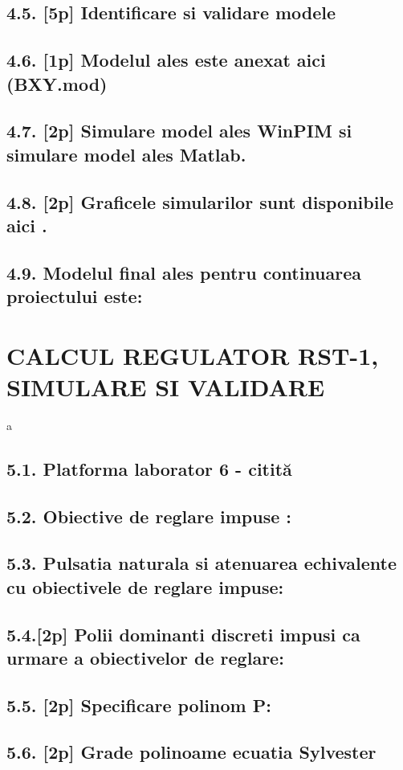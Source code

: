 \documentclass[12pt,english]{article}
\begin{document}
\subsection {4.5. [5p]  Identificare si validare modele }
\subsection {4.6. [1p] Modelul ales este anexat aici (BXY.mod) }
\subsection {4.7. [2p] Simulare model ales WinPIM si simulare model ales Matlab. }
\subsection {4.8. [2p]  Graficele simularilor sunt disponibile aici .  }
\subsection {4.9. Modelul final ales pentru continuarea proiectului este: }

\section { CALCUL REGULATOR RST-1, SIMULARE SI VALIDARE }
a
\subsection {5.1. Platforma laborator 6 - citită }
\subsection {5.2.  Obiective de reglare impuse  : }
\subsection {5.3. Pulsatia naturala si atenuarea echivalente cu obiectivele de reglare impuse: }
\subsection {5.4.[2p] Polii dominanti discreti impusi ca urmare a obiectivelor de reglare: }
\subsection {5.5. [2p] Specificare polinom P: }
\subsection {5.6. [2p] Grade polinoame ecuatia Sylvester }
\end{document}
